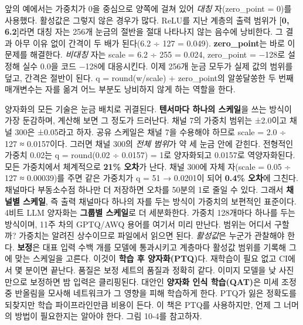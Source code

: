 앞의 예에서는 가중치가 0을 중심으로 양쪽에 걸쳐 있어 \textit{대칭} 자(zero\_point = 0)를 사용했다. 활성값은 그렇지 않은 경우가 많다. ReLU를 지난 계층의 출력 범위가 \textbf{[0, 6.2]}라면 대칭 자는 256개 눈금의 절반을 절대 나타나지 않는 음수에 낭비한다. 그 결과 아무 이유 없이 간격이 두 배가 된다(6.2 ÷ 127 = 0.049). \textbf{zero\_point}는 바로 이 문제를 해결한다. \textit{비대칭} 자는 scale = 6.2 ÷ 255 = 0.024, zero\_point = −128로 설정해 실수 0.0을 코드 −128에 대응시킨다. 이제 256개 눈금 모두가 실제 값의 범위를 덮고, 간격은 절반이 된다. q = round(w/scale) + zero\_point의 알쏭달쏭한 두 번째 매개변수는 자를 옮겨 어느 부분도 낭비하지 않게 하는 역할을 한다.

양자화의 모든 기술은 눈금 배치로 귀결된다. \textbf{텐서마다 하나의 스케일}을 쓰는 방식이 가장 둔감하며, 계산해 보면 그 정도가 드러난다. 채널 7의 가중치 범위는 ±2.0이고 채널 300은 ±0.05라고 하자. 공유 스케일은 채널 7을 수용해야 하므로 scale = 2.0 ÷ 127 ≈ 0.0157이다. 그러면 채널 300의 \textit{전체 범위}가 약 세 눈금 안에 갇힌다. 전형적인 가중치 0.02는 q = round(0.02 ÷ 0.0157) = 1로 양자화되고 0.0157로 역양자화된다. 모든 가중치에서 체계적으로 \textbf{21\% 오차}가 난다. 채널 300에 자체 자(scale = 0.05 ÷ 127 ≈ 0.00039)를 주면 같은 가중치가 q = 51 → 0.0201이 되어 \textbf{0.4\% 오차}에 그친다. 채널마다 부동소수점 하나만 더 저장하면 오차를 50분의 1로 줄일 수 있다. 그래서 \textbf{채널별 스케일}, 즉 출력 채널마다 하나의 자를 두는 방식이 가중치의 보편적인 표준이다. 4비트 LLM 양자화는 \textbf{그룹별 스케일}로 더 세분화한다. 가중치 128개마다 하나를 두는 방식이며, 11주 차의 GPTQ/AWQ 용어를 여기서 미리 만난다. 범위는 어디서 구할까? 가중치는 알려진 상수이므로 파일에서 읽으면 된다. \textit{활성값}은 누군가 관찰해야 한다. \textbf{보정}은 대표 입력 수백 개를 모델에 통과시키고 계층마다 활성값 범위를 기록해 그에 맞는 스케일을 고른다. 이것이 \textbf{학습 후 양자화(PTQ)}다. 재학습이 필요 없고 CI에서 몇 분이면 끝난다. 품질은 보정 세트의 품질과 정확히 같다. 이미지 모델을 낮 사진만으로 보정하면 밤 입력은 클리핑된다. 대안인 \textbf{양자화 인식 학습(QAT)}은 미세 조정 중 반올림을 모사해 네트워크가 그 영향을 피해 학습하게 한다. PTQ가 잃은 정확도를 되찾지만 학습 파이프라인만큼 비용이 든다. 이 책은 PTQ를 사용하지만, 언제 그 너머의 방법이 필요한지는 알아야 한다. 그림 10-4를 참고하자.

